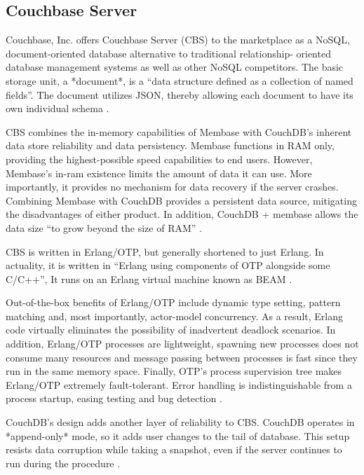 {     \pv

\subsection{Couchbase Server}


     Couchbase, Inc. offers Couchbase Server (CBS) to the marketplace
     as a NoSQL, document-oriented database alternative to traditional
     relationship- oriented database management systems as well as
     other NoSQL competitors.  The basic storage unit, a *document*,
     is a ``data structure defined as a collection of named fields''.
     The document utilizes JSON, thereby allowing each document to
     have its own individual schema \cite{www-infoworld-cbs}.

     CBS combines the in-memory capabilities of Membase with CouchDB's
     inherent data store reliability and data persistency.  Membase
     functions in RAM only, providing the highest-possible speed
     capabilities to end users.  However, Membase's in-ram existence
     limits the amount of data it can use.  More importantly, it
     provides no mechanism for data recovery if the server crashes.
     Combining Membase with CouchDB provides a persistent data source,
     mitigating the disadvantages of either product.  In addition,
     CouchDB + membase allows the data size ``to grow beyond the size
     of RAM''  \cite{www-safaribooks-cbs}.

     CBS is written in Erlang/OTP, but generally shortened to just
     Erlang.  In actuality, it is written in ``Erlang using components
     of OTP alongside some C/C++'', It
     runs on an Erlang virtual machine known as
     BEAM \cite{www-wikipedia-erlang-cbs} \cite{www-erlangcentral-cbs}.

     Out-of-the-box benefits of Erlang/OTP include dynamic type
     setting, pattern matching and, most importantly, actor-model
     concurrency.  As a result, Erlang code virtually eliminates the
     possibility of inadvertent deadlock scenarios.  In addition,
     Erlang/OTP processes are lightweight, spawning new processes does
     not consume many resources and message passing between processes
     is fast since they run in the same memory space.  Finally, OTP's
     process supervision tree makes Erlang/OTP extremely
     fault-tolerant.  Error handling is indistinguishable from a
     process startup, easing testing and bug detection
     \cite{www-couchbase-blog-cbs}.

     CouchDB's design adds another layer of reliability to CBS.
     CouchDB operates in *append-only* mode, so it adds user changes
     to the tail of database.  This setup resists data corruption
     while taking a snapshot, even if the server continues to run
     during the procedure \cite{www-hightower-cbs}.

}

